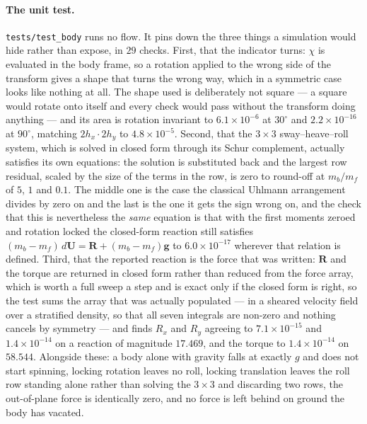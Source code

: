\documentclass[11pt,a4paper]{article}
\newcommand{\code}[1]{\texttt{\small #1}}
\newcommand{\e}[1]{\times 10^{#1}}
\begin{document}
\paragraph{The unit test.} \code{tests/test\_body} runs no flow. It pins down the
three things a simulation would hide rather than expose, in $29$ checks. First,
that the indicator turns: $\chi$ is evaluated in the body frame, so a rotation
applied to the wrong side of the transform gives a shape that turns the wrong
way, which in a symmetric case looks like nothing at all. The shape used is
deliberately not square --- a square would rotate onto itself and every check
would pass without the transform doing anything --- and its area is rotation
invariant to $6.1\e{-6}$ at $30^\circ$ and $2.2\e{-16}$ at $90^\circ$, matching
$2h_x\!\cdot\!2h_y$ to $4.8\e{-5}$. Second, that the $3\times3$ sway--heave--roll
system, which is solved in closed form through its Schur complement, actually
satisfies its own equations: the solution is substituted back and the largest row
residual, scaled by the size of the terms in the row, is zero to round-off at
$m_b/m_f$ of $5$, $1$ and $0.1$. The middle one is the case the classical Uhlmann
arrangement divides by zero on and the last is the one it gets the sign wrong on,
and the check that this is nevertheless the \emph{same} equation is that with the
first moments zeroed and rotation locked the closed-form reaction still satisfies
$(m_b-m_f)\,d\bm{U} = \bm{R} + (m_b-m_f)\bm{g}$ to $6.0\e{-17}$ wherever that
relation is defined. Third, that the reported reaction is the force that was
written: $\bm{R}$ and the torque are returned in closed form rather than reduced
from the force array, which is worth a full sweep a step and is exact only if the
closed form is right, so the test sums the array that was actually populated --- 
in a sheared velocity field over a stratified density, so that all seven
integrals are non-zero and nothing cancels by symmetry --- and finds $R_x$ and
$R_y$ agreeing to $7.1\e{-15}$ and $1.4\e{-14}$ on a reaction of magnitude
$17.469$, and the torque to $1.4\e{-14}$ on $58.544$. Alongside these: a body
alone with gravity falls at exactly $g$ and does not start spinning, locking
rotation leaves no roll, locking translation leaves the roll row standing alone
rather than solving the $3\times3$ and discarding two rows, the out-of-plane
force is identically zero, and no force is left behind on ground the body has
vacated.
\end{document}

